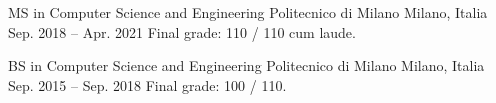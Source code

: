 

\begin{cventries}

\cventry
    {MS in Computer Science and Engineering}
    {Politecnico di Milano}
    {Milano, Italia}
    {Sep. 2018 -- Apr. 2021}
    {Final grade: 110 / 110 cum laude.}
    
\cventry
    {BS in Computer Science and Engineering}
    {Politecnico di Milano}
    {Milano, Italia}
    {Sep. 2015 -- Sep. 2018}
    {Final grade: 100 / 110.}
    
\end{cventries}
